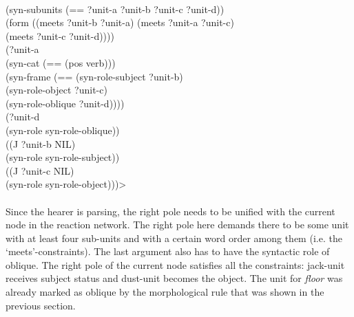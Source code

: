 {{\\ \hspace*{5mm} (syn-subunits (== ?unit-a ?unit-b ?unit-c ?unit-d))
\\ \hspace*{5mm} (form ((meets ?unit-b ?unit-a) (meets ?unit-a ?unit-c)
\\ \hspace*{19mm} (meets ?unit-c ?unit-d))))
\\ \hspace*{2mm}(?unit-a
\\ \hspace*{5mm} (syn-cat (== (pos verb)))
\\ \hspace*{5mm} (syn-frame (== (syn-role-subject ?unit-b)
\\ \hspace*{36mm}(syn-role-object ?unit-c)
\\ \hspace*{36mm}(syn-role-oblique ?unit-d))))
\\ \hspace*{2mm}(?unit-d
\\ \hspace*{5mm} (syn-role syn-role-oblique))
\\ \hspace*{2mm}((J ?unit-b NIL)
\\ \hspace*{5mm} (syn-role syn-role-subject))
\\ \hspace*{2mm}((J ?unit-c NIL) 
\\ \hspace*{5mm} (syn-role syn-role-object)))>}}
\\
\\
Since the hearer is parsing, the right pole needs to be unified with the current node in the reaction network. The right pole here demands there to be some unit with at least four sub-units and with a certain word order among them (i.e. the `meets'-constraints). The last argument also has to have the syntactic role of oblique. The right pole of the current node satisfies all the constraints: jack-unit receives subject status and dust-unit becomes the object. The unit for {\em floor} was already marked as oblique by the morphological rule that was shown in the previous section.

